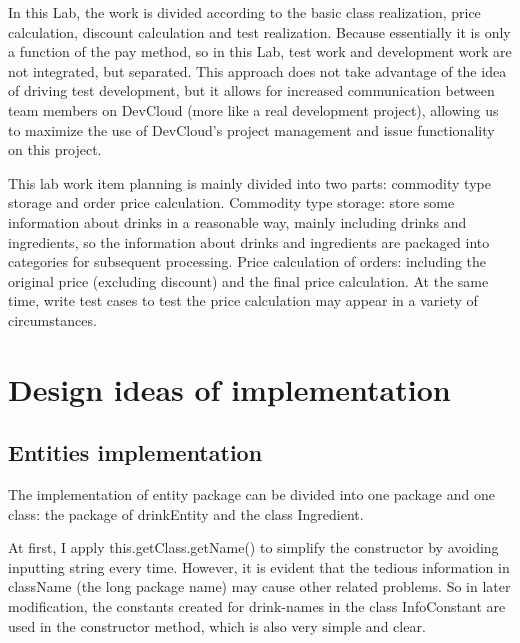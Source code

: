 \documentclass[a4paper]{report}
\begin{document}
In this Lab, the work is divided according to the basic class realization, price calculation, discount calculation and test realization. Because essentially it is only a function of the pay method, so in this Lab, test work and development work are not integrated, but separated. This approach does not take advantage of the idea of driving test development, but it allows for increased communication between team members on DevCloud (more like a real development project), allowing us to maximize the use of DevCloud's project management and issue functionality on this project.



This lab work item planning is mainly divided into two parts: commodity type storage and order price calculation. Commodity type storage: store some information about drinks in a reasonable way, mainly including drinks and ingredients, so the information about drinks and ingredients are packaged into categories for subsequent processing. Price calculation of orders: including the original price (excluding discount) and the final price calculation. At the same time, write test cases to test the price calculation may appear in a variety of circumstances.



\chapter{Design ideas of implementation}
\section{Entities implementation}
The implementation of entity package can be divided into one package and one class: the package of drinkEntity and the class Ingredient.
\par At first, I apply this.getClass.getName() to simplify the constructor by avoiding inputting string every time. However, it is evident that the tedious information in className (the long package name) may cause other related problems. So in later modification, the constants created for drink-names in the class InfoConstant are used in the constructor method, which is also very simple and clear.
\end{document}
